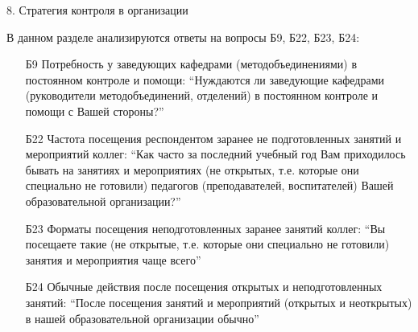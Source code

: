 \begin{frame}{8. Стратегия контроля в организации}

\tiny

В данном разделе анализируются ответы на вопросы Б9, Б22, Б23, Б24:
\bigskip

\begin{itemize}

\item [Б9] Потребность у заведующих кафедрами (методобъединениями)  в постоянном контроле и помощи: ``Нуждаются ли заведующие кафедрами  (руководители методобъединений, отделений) в постоянном контроле и помощи с Вашей стороны?''

\item [Б22] Частота посещения респондентом заранее не подготовленных занятий и мероприятий коллег: ``Как часто за последний учебный год Вам приходилось бывать на занятиях и мероприятиях (не открытых, т.е. которые они специально не готовили) педагогов (преподавателей, воспитателей) Вашей образовательной организации?''

\item [Б23] Форматы посещения неподготовленных заранее занятий коллег: ``Вы посещаете такие (не открытые, т.е. которые они специально не готовили) занятия и мероприятия чаще всего''

\item [Б24] Обычные действия после посещения открытых и неподготовленных занятий: ``После посещения занятий  и мероприятий (открытых и неоткрытых)  в нашей образовательной организации  обычно''

\end{itemize}

\end{frame}


